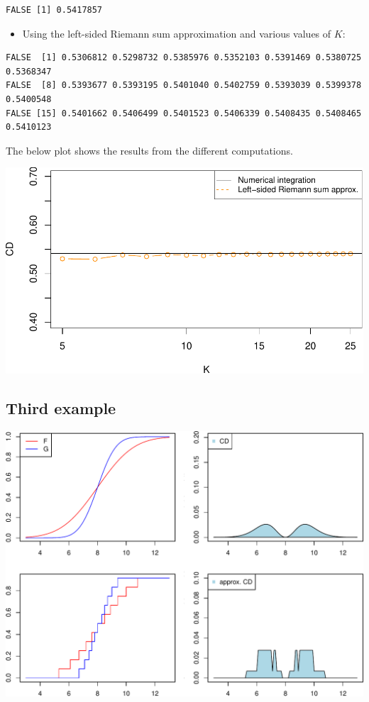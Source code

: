 \documentclass[
]{article}
\providecommand{\tightlist}{%
  \setlength{\itemsep}{0pt}\setlength{\parskip}{0pt}}
\begin{document}
\begin{verbatim}
FALSE [1] 0.5417857
\end{verbatim}

\begin{itemize}
\tightlist
\item
  Using the left-sided Riemann sum approximation and various values of
  \(K\):
\end{itemize}

\begin{verbatim}
FALSE  [1] 0.5306812 0.5298732 0.5385976 0.5352103 0.5391469 0.5380725 0.5368347
FALSE  [8] 0.5393677 0.5393195 0.5401040 0.5402759 0.5393039 0.5399378 0.5400548
FALSE [15] 0.5401662 0.5406499 0.5401523 0.5406339 0.5408435 0.5408465 0.5410123
\end{verbatim}

The below plot shows the results from the different computations.

\begin{center}\includegraphics{cd_approx_2_files/figure-latex/unnamed-chunk-11-1} \end{center}

\hypertarget{third-example}{%
\subsection{Third example}\label{third-example}}

\begin{center}\includegraphics{cd_approx_2_files/figure-latex/ex3-1} \end{center}
\end{document}
